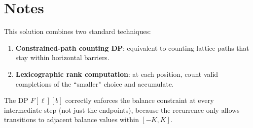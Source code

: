 \documentclass[11pt,a4paper]{article}
\begin{document}
\section{Notes}
This solution combines two standard techniques:
\begin{enumerate}
    \item \textbf{Constrained-path counting DP}: equivalent to counting lattice paths that stay within horizontal barriers.
    \item \textbf{Lexicographic rank computation}: at each position, count valid completions of the ``smaller'' choice and accumulate.
\end{enumerate}

The DP $F[\ell][b]$ correctly enforces the balance constraint at every intermediate step (not just the endpoints), because the recurrence only allows transitions to adjacent balance values within $[-K, K]$.
\end{document}
